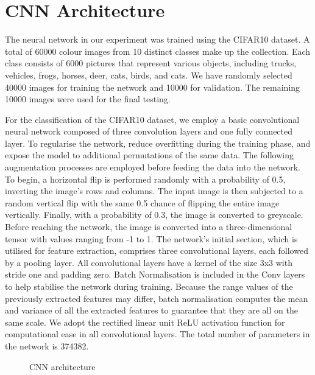 \documentclass[conference]{IEEEtran}
\begin{document}
\section{CNN Architecture}
The neural network in our experiment was trained using the CIFAR10\cite{CIFAR10} dataset. A total of 60000 colour images from 10 distinct classes make up the collection. Each class consists of 6000 pictures that represent various objects, including trucks, vehicles, frogs, horses, deer, cats, birds, and cats. We have randomly selected 40000 images for training the network and 10000 for validation. The remaining 10000 images were used for the final testing.
\par
For the classification of the CIFAR10\cite{CIFAR10} dataset, we employ a basic convolutional neural network composed of three convolution layers and one fully connected layer. To regularise the network, reduce overfitting during the training phase, and expose the model to additional permutations of the same data. The following augmentation processes are employed before feeding the data into the network. To begin, a horizontal flip is performed randomly with a probability of 0.5, inverting the image's rows and columns. The input image is then subjected to a random vertical flip with the same 0.5 chance of flipping the entire image vertically. Finally, with a probability of 0.3, the image is converted to greyscale. Before reaching the network, the image is converted into a three-dimensional tensor with values ranging from -1 to 1. 
The network's initial section, which is utilised for feature extraction, comprises three convolutional layers, each followed by a pooling layer. All convolutional layers have a kernel of the size 3x3 with stride one and padding zero. Batch Normalisation is included in the Conv layers to help stabilise the network during training. Because the range values of the previously extracted features may differ, batch normalisation computes the mean and variance of all the extracted features to guarantee that they are all on the same scale. We adopt the rectified linear unit ReLU activation function for computational ease in all convolutional layers. The total number of parameters in the network is 374382.
\begin{figure}[htp]

\centering{}
\caption{CNN architecture}
\label{fig:cnnj}
\end{figure}
\end{document}
